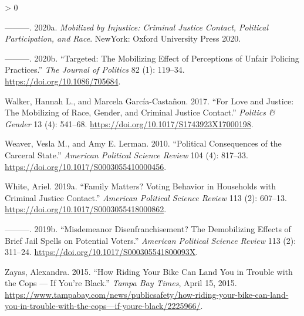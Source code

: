 \documentclass[
  12pt,
]{article}
\newlength{\cslhangindent}
\newenvironment{CSLReferences}[2] %
 {%
  \setlength{\parindent}{0pt}
  \ifodd #1 \everypar{\setlength{\hangindent}{\cslhangindent}}\ignorespaces\fi
  \ifnum #2 > 0
  \setlength{\parskip}{#2\baselineskip}
  \fi
 }%
 {}
\begin{document}
\begin{CSLReferences}{1}{0}
\leavevmode\hypertarget{ref-Walker2020a}{}%
---------. 2020a. \emph{Mobilized by Injustice: Criminal Justice Contact, Political Participation, and Race}. {NewYork}: {Oxford University Press 2020}.

\leavevmode\hypertarget{ref-Walker2020}{}%
---------. 2020b. {``Targeted: {The Mobilizing Effect} of {Perceptions} of {Unfair Policing Practices}.''} \emph{The Journal of Politics} 82 (1): 119--34. \url{https://doi.org/10.1086/705684}.

\leavevmode\hypertarget{ref-Walker2017}{}%
Walker, Hannah L., and Marcela García-Castañon. 2017. {``For {Love} and {Justice}: {The Mobilizing} of {Race}, {Gender}, and {Criminal Justice Contact}.''} \emph{Politics \& Gender} 13 (4): 541--68. \url{https://doi.org/10.1017/S1743923X17000198}.

\leavevmode\hypertarget{ref-Weaver2010}{}%
Weaver, Vesla M., and Amy E. Lerman. 2010. {``Political {Consequences} of the {Carceral State}.''} \emph{American Political Science Review} 104 (4): 817--33. \url{https://doi.org/10.1017/S0003055410000456}.

\leavevmode\hypertarget{ref-White2019}{}%
White, Ariel. 2019a. {``Family {Matters}? {Voting Behavior} in {Households} with {Criminal Justice Contact}.''} \emph{American Political Science Review} 113 (2): 607--13. \url{https://doi.org/10.1017/S0003055418000862}.

\leavevmode\hypertarget{ref-White2019a}{}%
---------. 2019b. {``Misdemeanor {Disenfranchisement}? {The Demobilizing Effects} of {Brief Jail Spells} on {Potential Voters}.''} \emph{American Political Science Review} 113 (2): 311--24. \url{https://doi.org/10.1017/S000305541800093X}.

\leavevmode\hypertarget{ref-Zayas2015}{}%
Zayas, Alexandra. 2015. {``How Riding Your Bike Can Land You in Trouble with the Cops --- If You're Black.''} \emph{Tampa Bay Times}, April 15, 2015. \url{https://www.tampabay.com/news/publicsafety/how-riding-your-bike-can-land-you-in-trouble-with-the-cops—if-youre-black/2225966/}.

\end{CSLReferences}
\end{document}
